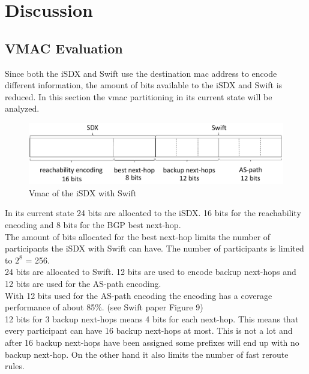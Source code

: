 \chapter{\label{chapter5}Discussion}


\section{\label{chapter5:vmac evaluation}VMAC Evaluation}

Since both the iSDX and Swift use the destination mac address to encode different information, the amount of bits available to  the iSDX and Swift is reduced. In this section the vmac partitioning in its current state will be analyzed.

\begin{figure}[h]
\center
\includegraphics[scale = 0.65]{Figures/eval_vmac_cropped2.pdf}
\caption{Vmac of the iSDX with Swift}
\end{figure}

In its current state 24 bits are allocated to the iSDX. 16 bits for the reachability encoding and 8 bits for the BGP best next-hop. \\
The amount of bits allocated for the best next-hop limits the number of participants the iSDX with Swift can have. The number of participants is limited to $2^8$ = 256. \\
24 bits are allocated to Swift. 12 bits are used to encode backup next-hops and 12 bits are used for the AS-path encoding. \\
With 12 bits used for the AS-path encoding the encoding has a coverage performance of about 85\%. (see Swift paper Figure 9)\\
12 bits for 3 backup next-hops means 4 bits for each next-hop. This means that every participant can have 16 backup next-hops at most. This is not a lot and after 16 backup next-hops have been assigned some prefixes will end up with no backup next-hop. On the other hand it also limits the number of fast reroute rules. 


